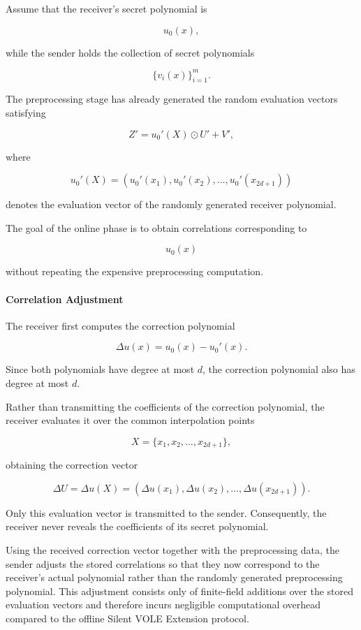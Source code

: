 \documentclass[11pt,a4paper]{article}
\begin{document}
Assume that the receiver's secret polynomial is

\[
u_0(x),
\]

while the sender holds the collection of secret polynomials

\[
\{v_i(x)\}_{i=1}^{m}.
\]

The preprocessing stage has already generated the random evaluation vectors satisfying

\[
Z'
=
u_0'(X)\odot U'
+
V',
\]

where

\[
u_0'(X)
=
\left(
u_0'(x_1),
u_0'(x_2),
\ldots,
u_0'(x_{2d+1})
\right)
\]

denotes the evaluation vector of the randomly generated receiver polynomial.

The goal of the online phase is to obtain correlations corresponding to

\[
u_0(x)
\]

without repeating the expensive preprocessing computation.

 

\paragraph{Correlation Adjustment}

The receiver first computes the correction polynomial

\[
\Delta u(x)
=
u_0(x)-u_0'(x).
\]

Since both polynomials have degree at most $d$, the correction polynomial also has degree at most $d$.

Rather than transmitting the coefficients of the correction polynomial, the receiver evaluates it over the
common interpolation points

\[
X
=
\{x_1,x_2,\ldots,x_{2d+1}\},
\]

obtaining the correction vector

\[
\Delta U
=
\Delta u(X)
=
\left(
\Delta u(x_1),
\Delta u(x_2),
\ldots,
\Delta u(x_{2d+1})
\right).
\]

Only this evaluation vector is transmitted to the sender. Consequently, the receiver never reveals the
coefficients of its secret polynomial.

Using the received correction vector together with the preprocessing data, the sender adjusts the stored
correlations so that they now correspond to the receiver's actual polynomial rather than the randomly
generated preprocessing polynomial. This adjustment consists only of finite-field additions over the stored
evaluation vectors and therefore incurs negligible computational overhead compared to the offline Silent
VOLE Extension protocol.
\end{document}
